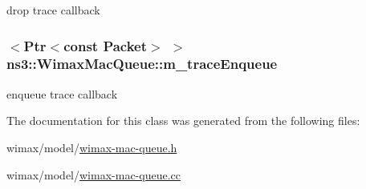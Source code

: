 drop trace callback 

\subsubsection[{\texorpdfstring{m\+\_\+trace\+Enqueue}{m_traceEnqueue}}]{$<${\bf Ptr}$<$const {\bf Packet}$>$ $>$ ns3\+::\+Wimax\+Mac\+Queue\+::m\+\_\+trace\+Enqueue\hspace{0.3cm}{\ttfamily [private]}}\hypertarget{classns3_1_1WimaxMacQueue_a4adff7167ee1ca8490d246560770ea20}{}\label{classns3_1_1WimaxMacQueue_a4adff7167ee1ca8490d246560770ea20}


enqueue trace callback 



The documentation for this class was generated from the following files\+:\begin{DoxyCompactItemize}
\item 
wimax/model/\hyperlink{wimax-mac-queue_8h}{wimax-\/mac-\/queue.\+h}\item 
wimax/model/\hyperlink{wimax-mac-queue_8cc}{wimax-\/mac-\/queue.\+cc}\end{DoxyCompactItemize}

